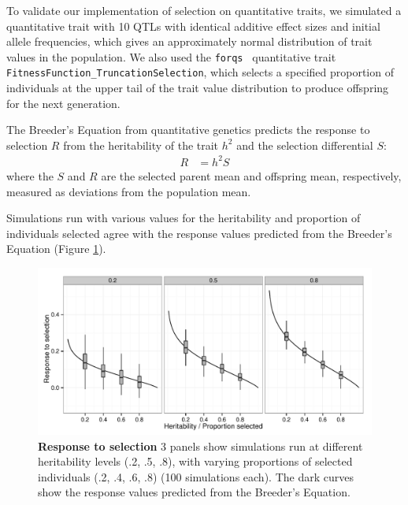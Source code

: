 \documentclass{article}
\newcommand{\forqs}[0]{\texttt{forqs }}
\begin{document}
To validate our implementation of selection on quantitative traits, we
simulated a quantitative trait with 10 QTLs with identical additive effect
sizes and initial allele frequencies, which gives an approximately normal
distribution of trait values in the population.  We also used the \forqs
quantitative trait \texttt{FitnessFunction\_TruncationSelection}, which selects a
specified proportion of individuals at the upper tail of the trait value
distribution to produce offspring for the next generation. 

The Breeder's Equation from quantitative genetics \citep{GillespieBook,
FalconerMackayBook} predicts the response to selection $R$ from the
heritability of the trait $h^2$ and the selection differential $S$:
\begin{align*}
    R &= h^2 S
\end{align*}
where the $S$ and $R$ are the selected parent mean and offspring mean,
respectively, measured as deviations from the population mean.

Simulations run with various values for the heritability and proportion of
individuals selected agree with the response values predicted from the Breeder's
Equation (Figure \ref{figure_validation_selection_response}).

\begin{figure}[H]
    \begin{center}
        \includegraphics[width=.9\textwidth]{fig/validation_selection_response.pdf}
    \end{center}
    \caption{{\bf Response to selection} 3 panels show simulations run at different
    heritability levels (.2, .5, .8), with varying proportions of selected individuals
    (.2, .4, .6, .8) (100 simulations each).  
    The dark curves show the response values predicted from the Breeder's Equation.
            }
    \label{figure_validation_selection_response}
\end{figure}
\end{document}
